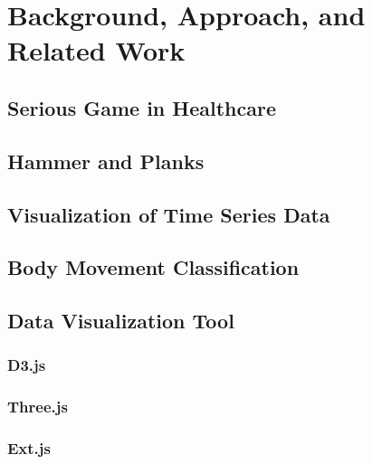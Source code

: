 \chapter{Background, Approach, and Related Work}
\label{chap:back}

\section{Serious Game in Healthcare}
\section{Hammer and Planks}
\section{Visualization of Time Series Data}
\section{Body Movement Classification}
\section{Data Visualization Tool}
\subsection{D3.js}
\subsection{Three.js}
\subsection{Ext.js}